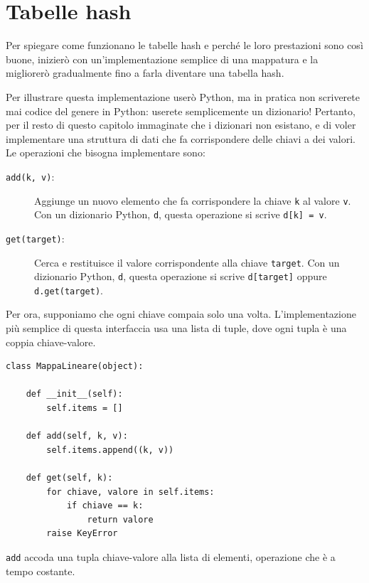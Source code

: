 \documentclass[10pt]{book}
\begin{document}
\section{Tabelle hash}
\label{hashtable}

Per spiegare come funzionano le tabelle hash e perché le loro prestazioni sono così buone, inizierò con un'implementazione semplice di una mappatura e la migliorerò gradualmente fino a farla diventare una tabella hash.

Per illustrare questa implementazione userò Python, ma in pratica non scriverete mai codice del genere in Python: userete semplicemente un dizionario! Pertanto, per il resto di questo capitolo immaginate che i dizionari non esistano, e di voler implementare una struttura di dati che fa corrispondere delle chiavi a dei valori. Le operazioni che bisogna implementare sono:

\begin{description}

\item[{\tt add(k, v)}:] Aggiunge un nuovo elemento che fa corrispondere la chiave {\tt k} al valore {\tt v}.  Con un dizionario Python, {\tt d}, questa operazione si scrive {\tt d[k] = v}.

\item[{\tt get(target)}:] Cerca e restituisce il valore corrispondente alla chiave {\tt target}.  Con un dizionario Python, {\tt d}, questa operazione si scrive {\tt d[target]} oppure {\tt d.get(target)}.

\end{description}

Per ora, supponiamo che ogni chiave compaia solo una volta. L'implementazione più semplice di questa interfaccia usa una lista di tuple, dove ogni tupla è una coppia chiave-valore.

\begin{verbatim}
class MappaLineare(object):

    def __init__(self):
        self.items = []

    def add(self, k, v):
        self.items.append((k, v))

    def get(self, k):
        for chiave, valore in self.items:
            if chiave == k:
                return valore
        raise KeyError
\end{verbatim}

{\tt add} accoda una tupla chiave-valore alla lista di elementi, operazione che è a tempo costante.
\end{document}
